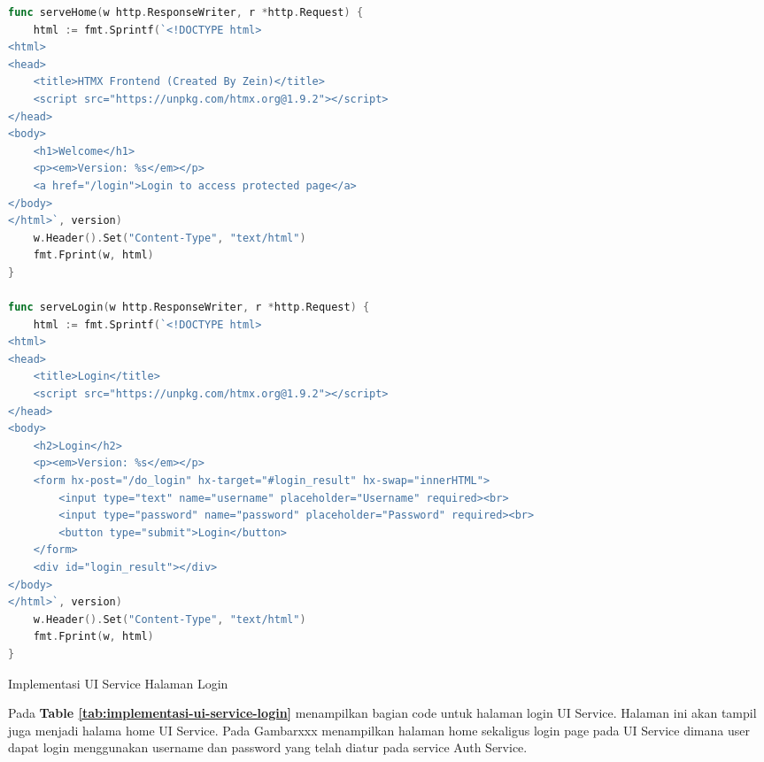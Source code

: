 \begin{table}[H]
  \centering
  \begin{minipage}{0.95\linewidth}
    \begin{lstlisting}[language=go, basicstyle=\footnotesize\ttfamily]
func serveHome(w http.ResponseWriter, r *http.Request) {
    html := fmt.Sprintf(`<!DOCTYPE html>
<html>
<head>
    <title>HTMX Frontend (Created By Zein)</title>
    <script src="https://unpkg.com/htmx.org@1.9.2"></script>
</head>
<body>
    <h1>Welcome</h1>
    <p><em>Version: %s</em></p>
    <a href="/login">Login to access protected page</a>
</body>
</html>`, version)
    w.Header().Set("Content-Type", "text/html")
    fmt.Fprint(w, html)
}

func serveLogin(w http.ResponseWriter, r *http.Request) {
    html := fmt.Sprintf(`<!DOCTYPE html>
<html>
<head>
    <title>Login</title>
    <script src="https://unpkg.com/htmx.org@1.9.2"></script>
</head>
<body>
    <h2>Login</h2>
    <p><em>Version: %s</em></p>
    <form hx-post="/do_login" hx-target="#login_result" hx-swap="innerHTML">
        <input type="text" name="username" placeholder="Username" required><br>
        <input type="password" name="password" placeholder="Password" required><br>
        <button type="submit">Login</button>
    </form>
    <div id="login_result"></div>
</body>
</html>`, version)
    w.Header().Set("Content-Type", "text/html")
    fmt.Fprint(w, html)
}
    \end{lstlisting}
  \end{minipage}
  \caption{Implementasi UI Service Halaman Login}
  \label{tab:implementasi-ui-service-login}
\end{table}
Pada \textbf{Table \ref{tab:implementasi-ui-service-login}} menampilkan bagian
code untuk halaman login UI Service. Halaman ini akan tampil juga menjadi
halama home UI Service. Pada Gambarxxx menampilkan halaman home sekaligus login page pada UI Service
dimana user dapat login menggunakan username dan password yang telah diatur
pada service Auth Service.

